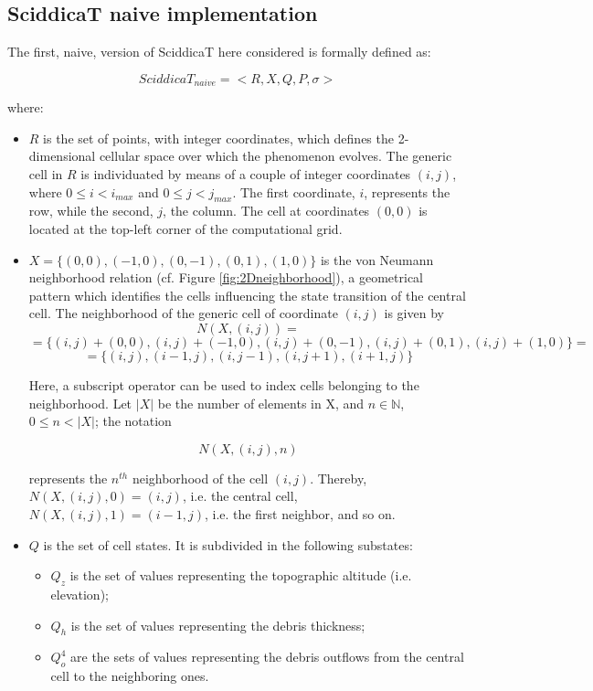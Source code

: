 \subsection{SciddicaT naive implementation}

The first, naive, version of SciddicaT here considered is formally
defined as:

$$SciddicaT_{naive} = < R, X, Q , P, \sigma  >$$

where:

\begin{itemize}

\item $R$ is the set of points, with integer coordinates, which
  defines the 2-dimensional cellular space over which the phenomenon
  evolves. The generic cell in $R$ is individuated by means of a
  couple of integer coordinates $(i, j)$, where $0 \leq i < i_{max}$
  and $0 \leq j < j_{max}$. The first coordinate, $i$, represents the
  row, while the second, $j$, the column. The cell at coordinates
  $(0,0)$ is located at the top-left corner of the computational grid.

\item $X = \{(0,0), (-1, 0), (0, -1), (0, 1), (1, 0)\}$ is the von
  Neumann neighborhood relation (cf. Figure \ref{fig:2Dneighborhood}), a
  geometrical pattern which identifies the cells influencing the state
  transition of the central cell. The neighborhood of the generic cell
  of coordinate $(i, j)$ is given by
$$N(X, (i, j)) =$$
$$= \{(i, j)+(0,0), (i, j)+(-1, 0), (i, j)+(0, -1),
(i, j)+(0, 1), (i, j)+(1, 0)\} =$$
$$= \{(i, j), (i-1, j), (i, j-1), (i, j+1), (i+1, j)\}$$

Here, a subscript operator can be used to index cells belonging to the
neighborhood. Let $|X|$ be the number of elements in X, and $n \in
\mathbb{N}$, $0 \leq n < |X|$; the notation

$$N(X, (i, j), n)$$

represents the $n^{th}$ neighborhood of the cell $(i,j)$. Thereby, $N(X, (i, j), 0) = (i, j)$, i.e. the central cell, $N(X, (i, j), 1) = (i-1, j)$, i.e. the first neighbor, and so on.

\item $Q$ is the set of cell states. It is subdivided in the following
  substates:

\begin{itemize}
    \item   $Q_z$ is the set of values representing the topographic altitude (i.e. elevation);
    \item   $Q_h$ is the set of values representing the debris thickness;
    \item   $Q_o^4$ are the sets of values representing the debris outflows from the central cell to the neighboring ones.
\end{itemize}


\end{itemize}
